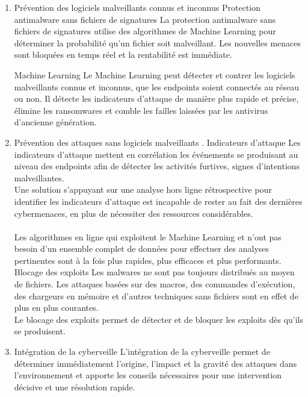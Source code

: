 \begin{enumerate}
 

 \item  Prévention des logiciels malveillants connus et inconnus
 Protection antimalware sans fichiers de signatures
 La protection antimalware sans fichiers de signatures utilise des algorithmes de Machine Learning pour déterminer la probabilité qu’un fichier soit malveillant. Les nouvelles menaces sont bloquées en temps réel et la rentabilité est immédiate.
 
  Machine Learning
 Le Machine Learning peut détecter et contrer les logiciels malveillants connus et inconnus, que les endpoints soient connectés au réseau ou non. Il détecte les indicateurs d’attaque de manière plus rapide et précise, élimine les ransomwares et comble les failles laissées par les antivirus d’ancienne génération.
 
\item  Prévention des attaques sans logiciels malveillants
 . Indicateurs d’attaque
 Les indicateurs d’attaque mettent en corrélation les événements se produisant au niveau des endpoints afin de détecter les activités furtives, signes d’intentions malveillantes.\\ 
 Une solution s’appuyant sur une analyse hors ligne rétrospective pour identifier les indicateurs d’attaque est incapable de rester au fait des dernières cybermenaces, en plus de nécessiter des ressources considérables.\\
  \\Les algorithmes en ligne qui exploitent le Machine Learning et n’ont pas besoin d’un ensemble complet de données pour effectuer des analyses pertinentes sont à la fois plus rapides, plus efficaces et plus performants.\\
 
  Blocage des exploits
 Les malwares ne sont pas toujours distribués au moyen de fichiers. Les attaques basées sur des macros, des commandes d’exécution, des chargeurs en mémoire et d’autres techniques sans fichiers sont en effet de plus en plus courantes.\\
  Le blocage des exploits permet de détecter et de bloquer les exploits dès qu’ils se produisent.\\
 
 \item   Intégration de la cyberveille
 L’intégration de la cyberveille permet de déterminer immédiatement l’origine, l’impact et la gravité des attaques dans l’environnement et apporte les conseils nécessaires pour une intervention décisive et une résolution rapide.\\
 

\end{enumerate}
